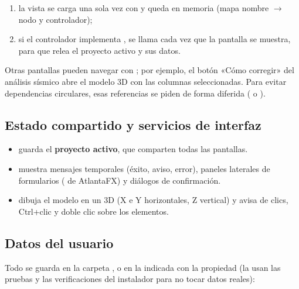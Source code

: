 \begin{enumerate}
	\item la vista se carga una sola vez con  y queda en memoria (mapa nombre $\rightarrow$ nodo y
	      controlador);
	\item si el controlador implementa , se llama  cada vez que la pantalla se muestra,
	      para que relea el proyecto activo y sus datos.
\end{enumerate}

Otras pantallas pueden navegar con ; por ejemplo, el botón
«Cómo corregir» del análisis sísmico abre el modelo 3D con las columnas seleccionadas. Para evitar dependencias
circulares, esas referencias se piden de forma diferida ( o ).

\subsection{Estado compartido y servicios de interfaz}

\begin{itemize}
	\item {} guarda el \textbf{proyecto activo}, que comparten todas las pantallas.
	\item {} muestra mensajes temporales (éxito, aviso, error), paneles laterales de formularios
	      ( de AtlantaFX) y diálogos de confirmación.
	\item {} dibuja el modelo en un  3D (X e Y horizontales, Z vertical) y avisa
	      de clics, Ctrl+clic y doble clic sobre los elementos.
\end{itemize}

\subsection{Datos del usuario}

Todo se guarda en la carpeta , o en la indicada con la propiedad
 (la usan las pruebas y las verificaciones del instalador para no tocar datos reales):

